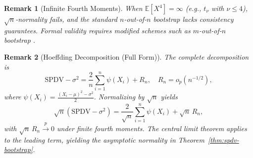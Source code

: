 \documentclass[12pt,a4paper]{article}
\newtheorem{remark}{Remark}
\begin{document}
\begin{remark}[Infinite Fourth Moments]
When $\mathbb{E}[X^4]=\infty$ (e.g., $t_\nu$ with $\nu \leq 4$), $\sqrt{n}$-normality fails, and the standard $n$-out-of-$n$ bootstrap lacks consistency guarantees. Formal validity requires modified schemes such as $m$-out-of-$n$ bootstrap \citep{Romano1990}.
\end{remark}

\begin{remark}[Hoeffding Decomposition (Full Form)]
The complete decomposition is
\[
\text{SPDV} - \sigma^2 = \frac{2}{n} \sum_{i=1}^n \psi(X_i) + R_n, \quad R_n = o_p(n^{-1/2}),
\]
where $\psi(X_i) = \frac{(X_i - \mu)^2 - \sigma^2}{2}$. Normalizing by $\sqrt{n}$ yields
\[
\sqrt{n}(\text{SPDV} - \sigma^2) = \frac{2}{\sqrt{n}} \sum_{i=1}^n \psi(X_i) + \sqrt{n}\,R_n,
\]
with $\sqrt{n}\,R_n \xrightarrow{p} 0$ under finite fourth moments. The central limit theorem applies to the leading term, yielding the asymptotic normality in Theorem~\ref{thm:spdv-bootstrap}.
\end{remark}
\end{document}
